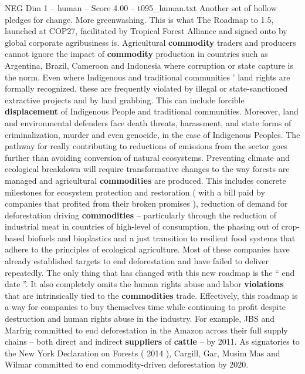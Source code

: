 \begin{textsample}{NEG Dim 1 – human – Score 4.00 – t095\_human.txt}  \label{ex:f1_neg_049}
Another set of hollow pledges for change.
More greenwashing.
This is what The Roadmap to 1.5, launched at COP27, facilitated by Tropical Forest Alliance and signed onto by global corporate agribusiness is.
Agricultural \textbf{commodity} traders and producers cannot ignore the impact of \textbf{commodity} production in countries such as Argentina, Brazil, Cameroon and Indonesia where corruption or state capture is the norm.
Even where Indigenous and traditional communities ’ land rights are formally recognized, these are frequently violated by illegal or state-sanctioned extractive projects and by land grabbing.
This can include forcible \textbf{displacement} of Indigenous People and traditional communities.
Moreover, land and environmental defenders face death threats, harassment, and state forms of criminalization, murder and even genocide, in the case of Indigenous Peoples.
The pathway for really contributing to reductions of emissions from the sector goes further than avoiding conversion of natural ecosystems.
Preventing climate and ecological breakdown will require transformative changes to the way forests are managed and agricultural \textbf{commodities} are produced.
This includes concrete milestones for ecosystem protection and restoration ( with a bill paid by companies that profited from their broken promises ), reduction of demand for deforestation driving \textbf{commodities} – particularly through the reduction of industrial meat in countries of high-level of consumption, the phasing out of crop-based biofuels and bioplastics and a just transition to resilient food systems that adhere to the principles of ecological agriculture.
Most of these companies have already established targets to end deforestation and have failed to deliver repeatedly.
The only thing that has changed with this new roadmap is the “ end date ”.
It also completely omits the human rights abuse and labor \textbf{violations} that are intrinsically tied to the \textbf{commodities} trade.
Effectively, this roadmap is a way for companies to buy themselves time while continuing to profit despite destruction and human rights abuse in the industry.
For example, JBS and Marfrig committed to end deforestation in the Amazon across their full supply chains – both direct and indirect \textbf{suppliers} of \textbf{cattle} – by 2011.
As signatories to the New York Declaration on Forests ( 2014 ), Cargill, Gar, Musim Mas and Wilmar committed to end commodity-driven deforestation by 2020.

\end{textsample}
